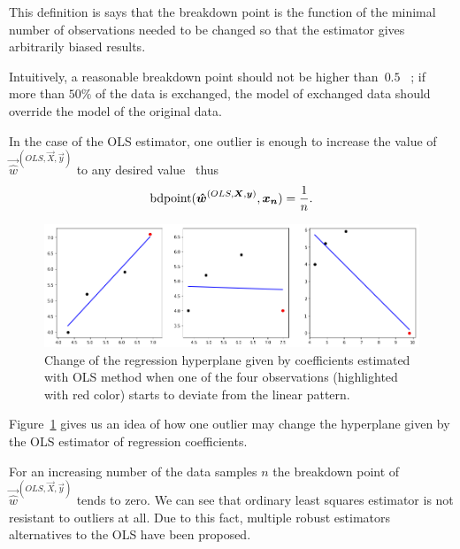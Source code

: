 This definition is says that the breakdown point is the function of the minimal number of observations needed to be changed so that the estimator gives arbitrarily biased results.

Intuitively, a reasonable breakdown point should not be higher than~$0.5$~\cite{rouss:1986} ; if more than $50\%$ of the data is exchanged, the model of exchanged data should override the model of the original data. 

In the case of the OLS estimator, one outlier is enough to increase the value of $\vec{\hat{w}}^{(OLS,\vec{X}, \vec{y})}$ to any desired value~\cite{agullo2001new} thus 
\begin{equation}
    \operatorname{bdpoint}(\boldsymbol{\hat{w}}^{(OLS,\boldsymbol{X}, \boldsymbol{y})},\boldsymbol{x_n} ) = \frac{1}{n}.
\end{equation}

\begin{figure}[h]
    \centering
    \includegraphics[width=12cm]{img/outlier_regression}
    \caption{Change of the regression hyperplane given by coefficients estimated with OLS method when one of the four observations (highlighted with red color) starts to deviate from the linear pattern.}
    \label{figure:outlier:hyperplane}
\end{figure}

Figure~\ref{figure:outlier:hyperplane} gives us an idea of how one outlier may change the hyperplane given by the OLS estimator of regression coefficients.



    

For an increasing number of the data samples $n$ the breakdown point of $\vec{\hat{w}}^{(OLS,\vec{X}, \vec{y})}$ tends to zero. We can see that ordinary least squares estimator is not resistant to outliers at all. Due to this fact, multiple robust estimators alternatives to the OLS have been proposed.




